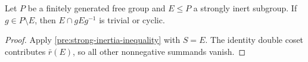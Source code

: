 \begin{corollary}
\label{pre:cyclic-off-diagonal}
Let \(P\) be a finitely generated free group and \(E\leq P\) a strongly
inert subgroup. If \(g\in P\setminus E\), then
\(E\cap gEg^{-1}\) is trivial or cyclic.
\end{corollary}

\begin{proof}
Apply \eqref{pre:strong-inertia-inequality} with \(S=E\).
The identity double coset contributes \(\bar r(E)\), so all other
nonnegative summands vanish.
\end{proof}
